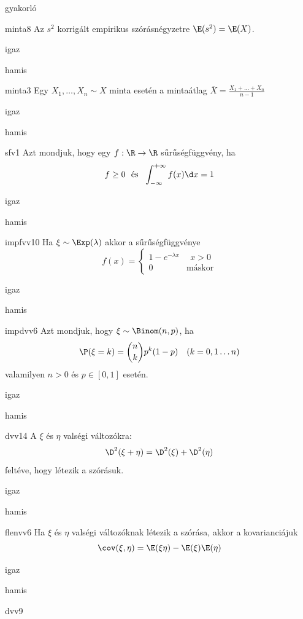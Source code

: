 \documentclass[12pt]{article}
\begin{document}
\begin{quiz}{gyakorló}
\begin{multi}[feedback={Az $s^2$ torzítatlan becslése a sokasági (elméleti) szórásnégyzetnek}]{minta8}
Az $s^2$ korrigált empirikus szórásnégyzetre $\E(s^2)=\E(X)$.
\item igaz
\item* hamis
\end{multi}
\begin{multi}[feedback={Definíció}]{minta3}
Egy $X_1,\ldots,X_n\sim X$ minta esetén a mintaátlag $\overline{X}=\frac{X_1+\ldots+X_n}{n-1}$
\item igaz
\item* hamis
\end{multi}
\begin{multi}[feedback={Def.}]{sfv1}
Azt mondjuk, hogy egy $f:\R\to \R$ sűrűségfüggvény, ha 
$$
f\ge 0 \ \ \text{és}\ \ \int_{-\infty}^{+\infty}f(x)\d x=1
$$
\item* igaz
\item hamis
\end{multi}
\begin{multi}[feedback={Def.}]{impfvv10}
Ha $\xi\sim \Exp(\lambda)$ akkor a sűrűségfüggvénye 
$$
f(x)=
\begin{cases}
1-e^{-\lambda x}& \ \ x>0\\
0 & \text{máskor} 
\end{cases}
$$
\item igaz
\item* hamis
\end{multi}
\begin{multi}[feedback={Def.}]{impdvv6}
Azt mondjuk, hogy $\xi\sim \Binom(n,p)$, ha 
$$
\P(\xi=k)=\binom{n}{k}p^k(1-p)\ \ \ (k=0,1\ldots n)
$$
valamilyen $n>0$ és $p\in[0,1]$ esetén.
\item igaz
\item* hamis
\end{multi}
\begin{multi}[feedback={Páronként független valségi változókra a szórásnégyzet additív, általában nem.}]{dvv14}
A $\xi$ és $\eta$ valségi változókra:
$$
\D^2(\xi+\eta)=\D^2(\xi)+\D^2(\eta)
$$
feltéve, hogy létezik a szórásuk.
\item igaz
\item* hamis
\end{multi}
\begin{multi}[feedback={Tulajdonság.}]{flenvv6}
Ha $\xi$ és $\eta$ valségi változóknak létezik a szórása, akkor a 
kovarianciájuk
$$
\cov(\xi,\eta)=\E(\xi\eta)-\E(\xi)\E(\eta)
$$
\item* igaz
\item hamis
\end{multi}
\begin{multi}[feedback={Def.}]{dvv9}

\end{multi}
\end{quiz}
\end{document}
